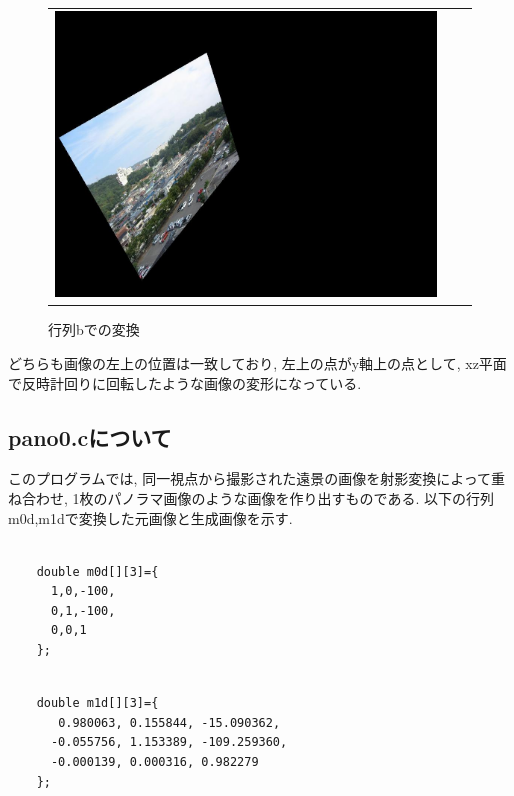 \documentclass[a4j]{jarticle}
\begin{document}
\begin{figure}[htbp]
\begin{tabular}{ccc}
\begin{minipage}{0.3\hsize}
\includegraphics[bb=0 0 1024 768,scale=.13]{../2/outb.jpg}
\caption{行列bでの変換}
\end{minipage}
\end{tabular}
\end{figure}

どちらも画像の左上の位置は一致しており, 左上の点がy軸上の点として, xz平面で反時計回りに回転したような画像の変形になっている. 

\newpage
\subsection{pano0.cについて}
このプログラムでは, 同一視点から撮影された遠景の画像を射影変換によって重ね合わせ, 1枚のパノラマ画像のような画像を作り出すものである. 以下の行列m0d,m1dで変換した元画像と生成画像を示す. 

\begin{minipage}{0.5\hsize}
\begin{verbatim}

    double m0d[][3]={
      1,0,-100,
      0,1,-100,
      0,0,1
    };
\end{verbatim}
\end{minipage}
\begin{minipage}{0.5\hsize}
\begin{verbatim}

    double m1d[][3]={
       0.980063, 0.155844, -15.090362,
      -0.055756, 1.153389, -109.259360,
      -0.000139, 0.000316, 0.982279
    };
\end{verbatim}
\end{minipage}
\end{document}

